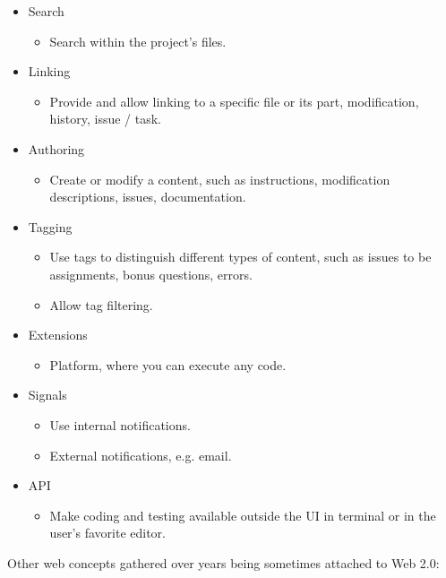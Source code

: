 \begin{itemize}
  \item Search
    \begin{itemize}
    \item Search within the project’s files.
    \end{itemize}
  \item Linking
    \begin{itemize}
    \item Provide and allow linking to a specific file or its part, modification, history, issue / task.
    \end{itemize}
  \item Authoring
    \begin{itemize}
    \item Create or modify a content, such as instructions, modification descriptions, issues, documentation.
    \end{itemize}
  \item Tagging
    \begin{itemize}
    \item Use tags to distinguish different types of content, such as issues to be assignments, bonus questions, errors.
    \item Allow tag filtering.
    \end{itemize}
  \item Extensions
    \begin{itemize}
    \item Platform, where you can execute any code.
    \end{itemize}
  \item Signals
    \begin{itemize}
    \item Use internal notifications.
    \item External notifications, e.g. email.
    \end{itemize}
  \item API
    \begin{itemize}
    \item Make coding and testing available outside the UI in terminal or in the user’s favorite editor.
    \end{itemize}
\end{itemize}

{Other web concepts gathered over years being sometimes attached to Web 2.0:}

